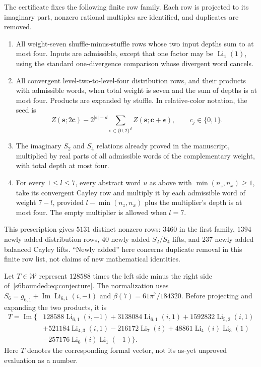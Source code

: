 \documentclass[11pt,a4paper]{article}
\numberwithin{equation}{section}
\theoremstyle{definition}
\theoremstyle{remark}
\begin{document}
The certificate fixes the following finite row family. Each row is
projected to its imaginary part, nonzero rational multiples are
identified, and duplicates are removed.
\begin{enumerate}
\item All weight-seven shuffle-minus-stuffle rows whose two input
      depths sum to at most four. Inputs are admissible, except that
      one factor may be $\operatorname{Li}_1(1)$, using the standard
      one-divergence comparison whose divergent word cancels.
\item All convergent level-two-to-level-four distribution rows,
      and their products with admissible words, when total weight is
      seven and the sum of depths is at most four. Products are
      expanded by stuffle. In relative-color notation, the seed is
      \[
      Z(\boldsymbol s;2\boldsymbol c)
      -2^{|\boldsymbol s|-d}
        \sum_{\boldsymbol\epsilon\in\{0,2\}^d}
        Z(\boldsymbol s;\boldsymbol c+\boldsymbol\epsilon),
      \qquad c_j\in\{0,1\}.
      \]
\item The imaginary $S_2$ and $S_4$ relations already proved in the
      manuscript, multiplied by real parts of all admissible words
      of the complementary weight, with total depth at most four.
\item For every $1\le l\le7$, every abstract word $u$ as above with
      $\min(n_z,n_x)\ge1$, take its convergent Cayley row and multiply
      it by each admissible word of weight $7-l$, provided
      $l-\min(n_z,n_x)$ plus the multiplier's depth is at most four.
      The empty multiplier is allowed when $l=7$.
\end{enumerate}
This prescription gives $5131$ distinct nonzero rows: $3460$ in the
first family, $1394$ newly added distribution rows, $40$ newly added
$S_2/S_4$ lifts, and $237$ newly added balanced Cayley lifts.
``Newly added'' here concerns duplicate removal in this finite row list,
not claims of new mathematical identities.

Let $T\in\mathcal W$ represent $128588$ times the left side minus the
right side of~\eqref{s6bounded:eq:conjecture}. The normalization uses
$S_6=g_{6,1}+\operatorname{Im}\operatorname{Li}_{6,1}(i,-1)$ and
$\beta(7)=61\pi^7/184320$. Before projecting and expanding the two
products, it is
\begin{align*}
 T=\operatorname{Im}\{&128588\operatorname{Li}_{6,1}(i,-1)
 +3138084\operatorname{Li}_{6,1}(i,1)
 +1592832\operatorname{Li}_{5,2}(i,1)\\
 &+521184\operatorname{Li}_{4,3}(i,1)
 -216172\operatorname{Li}_7(i)
 +48861\operatorname{Li}_4(i)\operatorname{Li}_3(1)\\
 &-257176\operatorname{Li}_6(i)\operatorname{Li}_1(-1)\}.
\end{align*}
Here $T$ denotes the corresponding formal vector, not its as-yet
unproved evaluation as a number.
\end{document}
